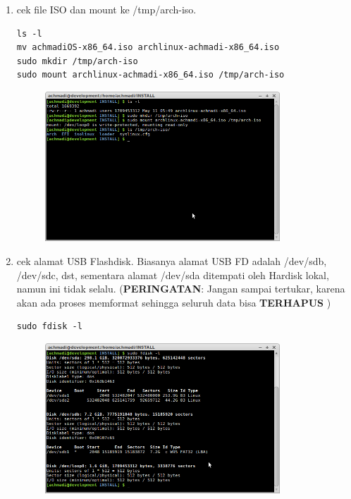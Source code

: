 \documentclass[12pt,]{article}
\begin{document}
	\begin{enumerate}
		\item cek file ISO dan mount ke /tmp/arch-iso.
		\begin{verbatim}
ls -l 
mv achmadiOS-x86_64.iso archlinux-achmadi-x86_64.iso
sudo mkdir /tmp/arch-iso 
sudo mount archlinux-achmadi-x86_64.iso /tmp/arch-iso
		\end{verbatim} 
		
		\begin{figure}[h]
			\centering
			\includegraphics[width=250pt]{usbubuntu/step_1}
		\end{figure} 
	
		\item cek alamat USB Flashdisk.
		Biasanya alamat USB FD adalah /dev/sdb, /dev/sdc, dst, sementara alamat /dev/sda ditempati oleh Hardisk lokal, namun ini tidak selalu.
		(\textbf{PERINGATAN}: Jangan sampai tertukar, karena akan ada proses memformat sehingga seluruh data bisa \textbf{TERHAPUS} )
		
		\begin{verbatim}
sudo fdisk -l
		\end{verbatim} 
		
		\newpage
		\begin{figure}[h]
			\centering
			\includegraphics[width=250pt]{usbubuntu/step_2}
		\end{figure}
	

\end{enumerate}
\end{document}
